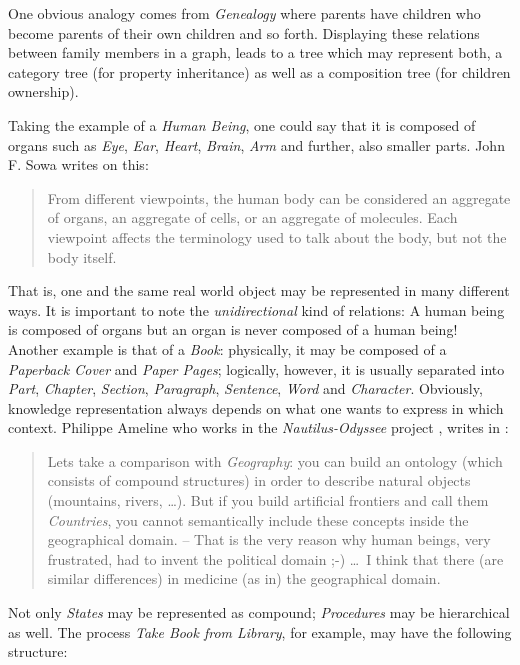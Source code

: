 One obvious analogy comes from \emph{Genealogy} where parents have children who
become parents of their own children and so forth. Displaying these relations
between family members in a graph, leads to a tree which may represent both,
a category tree (for property inheritance) as well as a composition tree (for
children ownership).

Taking the example of a \emph{Human Being}, one could say that it is composed
of organs such as \emph{Eye}, \emph{Ear}, \emph{Heart}, \emph{Brain},
\emph{Arm} and further, also smaller parts. John F. Sowa \cite[p. 109]{sowa}
writes on this:

\begin{quote}
    From different viewpoints, the human body can be considered an aggregate of
    organs, an aggregate of cells, or an aggregate of molecules. Each viewpoint
    affects the terminology used to talk about the body, but not the body itself.
\end{quote}

That is, one and the same real world object may be represented in many
different ways. It is important to note the \emph{unidirectional} kind of
relations: A human being is composed of organs but an organ is never composed
of a human being! Another example is that of a \emph{Book}: physically, it may
be composed of a \emph{Paperback Cover} and \emph{Paper Pages}; logically,
however, it is usually separated into \emph{Part}, \emph{Chapter},
\emph{Section}, \emph{Paragraph}, \emph{Sentence}, \emph{Word} and
\emph{Character}. Obviously, knowledge representation always depends on what
one wants to express in which context. Philippe Ameline who works in the
\emph{Nautilus-Odyssee} project \cite{nautilus}, writes in \cite{openhealth}:

\begin{quote}
    Lets take a comparison with \emph{Geography}: you can build an ontology
    (which consists of compound structures) in order to describe natural
    objects (mountains, rivers, \ldots). But if you build artificial frontiers
    and call them \emph{Countries}, you cannot semantically include these
    concepts inside the geographical domain. -- That is the very reason why
    human beings, very frustrated, had to invent the political domain ;-)
    \ldots\ I think that there (are similar differences) in medicine (as in)
    the geographical domain.
\end{quote}

Not only \emph{States} may be represented as compound; \emph{Procedures} may be
hierarchical as well. The process \emph{Take Book from Library}, for example,
may have the following structure:

